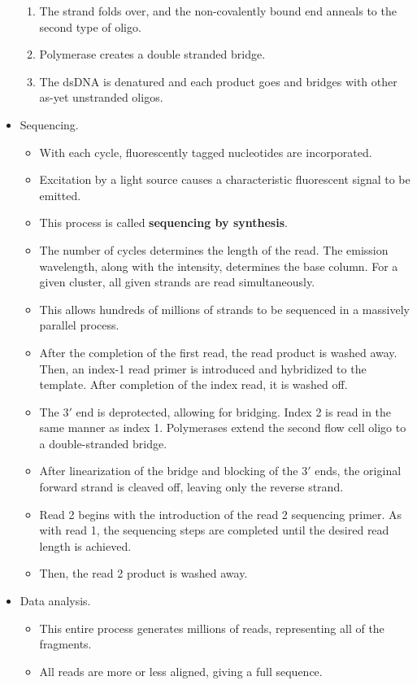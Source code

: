 \documentclass[../notes.tex]{subfiles}
\begin{document}
\begin{itemize}
\begin{enumerate}
        \item The strand folds over, and the non-covalently bound end anneals to the second type of oligo.
        \item Polymerase creates a double stranded bridge.
        \item The dsDNA is denatured and each product goes and bridges with other as-yet unstranded oligos.
    \end{enumerate}
    \item Sequencing.
    \begin{itemize}
        \item With each cycle, fluorescently tagged nucleotides are incorporated.
        \item Excitation by a light source causes a characteristic fluorescent signal to be emitted.
        \item This process is called \textbf{sequencing by synthesis}.
        \item The number of cycles determines the length of the read. The emission wavelength, along with the intensity, determines the base column. For a given cluster, all given strands are read simultaneously.
        \item This allows hundreds of millions of strands to be sequenced in a massively parallel process.
        \item After the completion of the first read, the read product is washed away. Then, an index-1 read primer is introduced and hybridized to the template. After completion of the index read, it is washed off.
        \item The $3'$ end is deprotected, allowing for bridging. Index 2 is read in the same manner as index 1. Polymerases extend the second flow cell oligo to a double-stranded bridge.
        \item After linearization of the bridge and blocking of the $3'$ ends, the original forward strand is cleaved off, leaving only the reverse strand.
        \item Read 2 begins with the introduction of the read 2 sequencing primer. As with read 1, the sequencing steps are completed until the desired read length is achieved.
        \item Then, the read 2 product is washed away.
    \end{itemize}
    \item Data analysis.
    \begin{itemize}
        \item This entire process generates millions of reads, representing all of the fragments.
        \item All reads are more or less aligned, giving a full sequence.
    \end{itemize}
\end{itemize}
\end{document}
